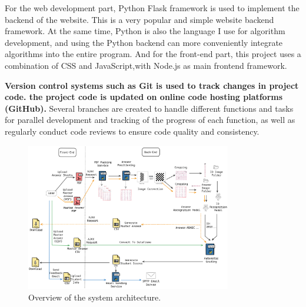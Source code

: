 \documentclass[twocolumn]{article}
\begin{document}
    For the web development part, Python Flask\cite{flask} framework is used to implement the backend of the website. This is a very popular and simple website backend framework. At the same time, Python is also the language I use for algorithm development, and using the Python backend can more conveniently integrate algorithms into the entire program. And for the front-end part, this project uses a combination of CSS and JavaScript,with Node.js as main frontend framework.

   \textbf{Version control systems such as Git is used to track changes in project code. the project code is updated on online code hosting platforms (GitHub).} Several branches are created to handle different functions and tasks for parallel development and tracking of the progress of each function, as well as regularly conduct code reviews to ensure code quality and consistency.

    \begin{figure}
    \centering
    \includegraphics[width=0.8\textwidth]{Architecture.png}
    \caption{Overview of the system architecture.}
    \label{fig:architecture}
    \end{figure}
\end{document}
